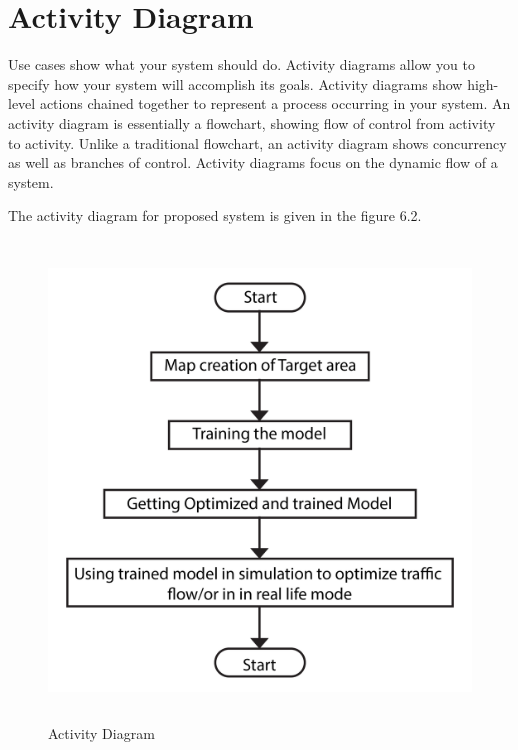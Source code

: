 \documentclass[openany,12pt]{report}
\begin{document}
	\section{Activity Diagram}
	\hspace*{0.5in}Use cases show what your system should do. Activity diagrams allow you to specify how your system will accomplish its goals. Activity diagrams show high-level actions chained together to represent a process occurring in your system. An activity diagram is essentially a flowchart, showing flow of control from activity to activity. Unlike a traditional flowchart, an activity diagram shows concurrency as well as branches of control. Activity diagrams focus on the dynamic flow of a system.\\

	The activity diagram for proposed system is given in the figure 6.2.
	\begin{figure}[H]
		\centering
		\includegraphics[height=5in]{./Diagrams/PNG/flow}
		\caption{Activity Diagram}
	\end{figure}
	\newpage
	
\end{document}

